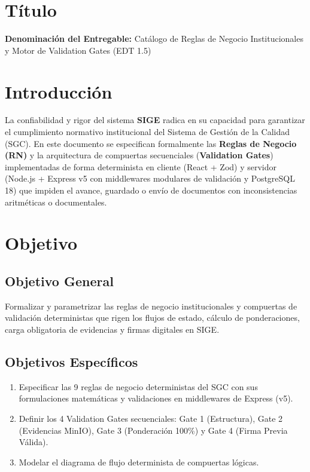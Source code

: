 \documentclass[12pt,a4paper]{article}
\begin{document}
\section{Título}
\textbf{Denominación del Entregable:} Catálogo de Reglas de Negocio Institucionales y Motor de Validation Gates (EDT 1.5)



\section{Introducción}
La confiabilidad y rigor del sistema \textbf{SIGE} radica en su capacidad para garantizar el cumplimiento normativo institucional del Sistema de Gestión de la Calidad (SGC). En este documento se especifican formalmente las \textbf{Reglas de Negocio (RN)} y la arquitectura de compuertas secuenciales (\textbf{Validation Gates}) implementadas de forma determinista en cliente (React + Zod) y servidor (Node.js + Express v5 con middlewares modulares de validación y PostgreSQL 18) que impiden el avance, guardado o envío de documentos con inconsistencias aritméticas o documentales.

\section{Objetivo}

\subsection{Objetivo General}
Formalizar y parametrizar las reglas de negocio institucionales y compuertas de validación deterministas que rigen los flujos de estado, cálculo de ponderaciones, carga obligatoria de evidencias y firmas digitales en SIGE.

\subsection{Objetivos Específicos}
\begin{enumerate}[leftmargin=1.5em, itemsep=2pt, topsep=2pt]
    \item Especificar las 9 reglas de negocio deterministas del SGC con sus formulaciones matemáticas y validaciones en middlewares de Express (v5).
    \item Definir los 4 Validation Gates secuenciales: Gate 1 (Estructura), Gate 2 (Evidencias MinIO), Gate 3 (Ponderación 100\%) y Gate 4 (Firma Previa Válida).
    \item Modelar el diagrama de flujo determinista de compuertas lógicas.
\end{enumerate}
\end{document}
